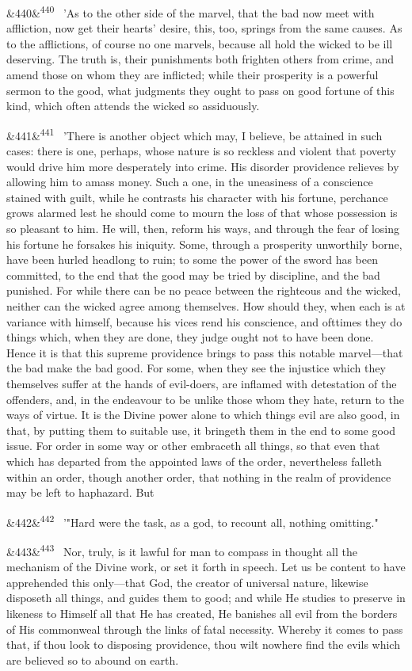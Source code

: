 \documentclass[12pt]{article}
\newcommand{\para}[1][]{\par\noindent\ifx&#1&\else\textsuperscript{\footnotesize #1}~\fi}
\begin{document}
\para[440] 'As to the other side of the marvel, that the bad now meet with affliction, now get their hearts' desire, this, too, springs from the same causes. As to the afflictions, of course no one marvels, because all hold the wicked to be ill deserving. The truth is, their punishments both frighten others from crime, and amend those on whom they are inflicted; while their prosperity is a powerful sermon to the good, what judgments they ought to pass on good fortune of this kind, which often attends the wicked so assiduously.

\para[441] 'There is another object which may, I believe, be attained in such cases: there is one, perhaps, whose nature is so reckless and violent that poverty would drive him more desperately into crime. His disorder providence relieves by allowing him to amass money. Such a one, in the uneasiness of a conscience stained with guilt, while he contrasts his character with his fortune, perchance grows alarmed lest he should come to mourn the loss of that whose possession is so pleasant to him. He will, then, reform his ways, and through the fear of losing his fortune he forsakes his iniquity. Some, through a prosperity unworthily borne, have been hurled headlong to ruin; to some the power of the sword has been committed, to the end that the good may be tried by discipline, and the bad punished. For while there can be no peace between the righteous and the wicked, neither can the wicked agree among themselves. How should they, when each is at variance with himself, because his vices rend his conscience, and ofttimes they do things which, when they are done, they judge ought not to have been done. Hence it is that this supreme providence brings to pass this notable marvel---that the bad make the bad good. For some, when they see the injustice which they themselves suffer at the hands of evil-doers, are inflamed with detestation of the offenders, and, in the endeavour to be unlike those whom they hate, return to the ways of virtue. It is the Divine power alone to which things evil are also good, in that, by putting them to suitable use, it bringeth them in the end to some good issue. For order in some way or other embraceth all things, so that even that which has departed from the appointed laws of the order, nevertheless falleth within an order, though another order, that nothing in the realm of providence may be left to haphazard. But

\para[442] '"Hard were the task, as a god, to recount all, nothing omitting."

\para[443] Nor, truly, is it lawful for man to compass in thought all the mechanism of the Divine work, or set it forth in speech. Let us be content to have apprehended this only---that God, the creator of universal nature, likewise disposeth all things, and guides them to good; and while He studies to preserve in likeness to Himself all that He has created, He banishes all evil from the borders of His commonweal through the links of fatal necessity. Whereby it comes to pass that, if thou look to disposing providence, thou wilt nowhere find the evils which are believed so to abound on earth.
\end{document}
